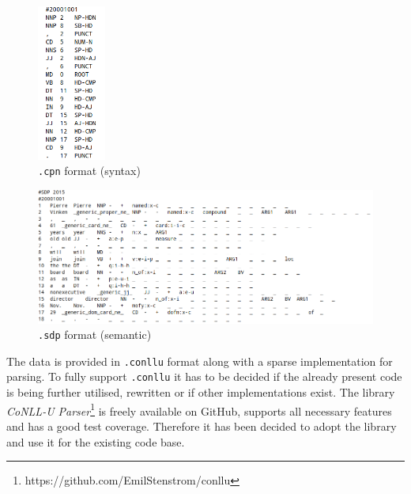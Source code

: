 \documentclass[11pt]{scrartcl}
\begin{document}
\begin{figure}[hbt]
	\center
	\includegraphics[width=0.2\textwidth]{img/syntax_format}
	\caption{\texttt{.cpn} format (syntax)}
	\label{fig:syntax_format}
\end{figure}

\begin{figure}[hbt]
	\center
	\includegraphics[width=1.0\textwidth]{img/semantic_format}
	\caption{\texttt{.sdp} format (semantic)}
	\label{fig:semantic_format}
\end{figure}

The data is provided in \texttt{.conllu} format along with a sparse implementation for parsing. To fully support \texttt{.conllu} it has to be decided if the already present code is being further utilised, rewritten or if other implementations exist. The library \textit{CoNLL-U Parser}\footnote{https://github.com/EmilStenstrom/conllu} is freely available on GitHub, supports all necessary features and has a good test coverage. Therefore it has been decided to adopt the library and use it for the existing code base.
\end{document}

